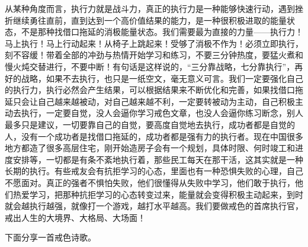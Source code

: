 从某种角度而言，执行力就是战斗力，真正的执行力是一种能够快速行动，遇到挫折继续勇往直前，直到达到一个高价值结果的能力，是一种很积极进取的能量状态，不是那种找借口拖延的消极能量状态。我们需要最为直接的力量——执行力！马上执行！马上行动起来！从椅子上跳起来！受够了消极不作为！必须立即执行，刻不容缓！带着全部的冲劲与热情开始学习和练习，不要三分钟热度，要猛火煮和慢火炖交替进行，不要中断！有句话是这样说的，“三分靠战略，七分靠执行”，再好的战略，如果不去执行，也只是一纸空文，毫无意义可言。我们一定要强化自己的执行力，执行必然会产生结果，可以根据结果来不断优化和完善，如果找借口拖延只会让自己越来越被动，对自己越来越不利，一定要转被动为主动，自己积极主动去执行，一定要自觉，没人会逼你学习戒色文章，也没人会逼你练习断念，别人最多只是建议，一切要靠自己的自觉，要高度自觉地去执行，成功者都是自觉的人，没有一个成功者是找借口拖延的，成功者都是强有力的执行者。现在中国很多地方都造了很多高层住宅，刚开始造房子会有一个规划，具体时限、何时竣工和进度安排等，一切都是有条不紊地执行着，那些民工每天在那干活，这其实就是一种长期的执行。有些戒友会有抗拒学习的心态，里面也有一种恐惧失败的心理，自己不愿面对。真正的强者不惧怕失败，他们很懂得从失败中学习，他们敢于执行，他们热爱学习，把那种抗拒学习的心态转变过来，能量就会变得积极主动起来，到时就会越执行越强，就像打一个游戏，越打水平越高。我们要做戒色的首席执行官，戒出人生的大境界、大格局、大场面！

下面分享一首戒色诗歌。

